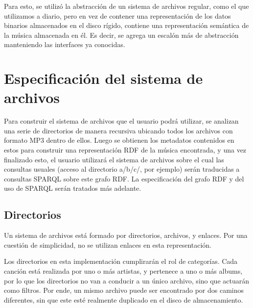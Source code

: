 \documentclass[a4paper,oneside]{report}
\begin{document}
Para esto, se utilizó la abstracción de un sistema de archivos regular, como el que utilizamos a diario, pero en vez de contener una representación de los datos binarios almacenados en el disco rígido, contiene una representación semántica de la música almacenada en él. Es decir, se agrega un escalón más de abstracción manteniendo las interfaces ya conocidas.


\chapter{Especificación del sistema de archivos}

Para construir el sistema de archivos que el usuario podrá utilizar, se analizan una serie de directorios de manera recursiva ubicando todos los archivos con formato MP3 dentro de ellos. Luego se obtienen los metadatos contenidos en estos para construir una representación RDF de la música encontrada, y una vez finalizado esto, el usuario utilizará el sistema de archivos sobre el cual las consultas usuales (acceso al directorio a/b/c/, por ejemplo) serán traducidas a consultas SPARQL sobre este grafo RDF. La especificación del grafo RDF y del uso de SPARQL serán tratados más adelante.

\section{Directorios}

Un sistema de archivos está formado por directorios, archivos, y enlaces. Por una cuestión de simplicidad, no se utilizan enlaces en esta representación.

Los directorios en esta implementación cumplirarán el rol de categorías. Cada canción está realizada por uno o más artistas, y pertenece a uno o más albums, por lo que los directorios no van a conducir a un único archivo, sino que actuarán como filtros. Por ende, un mismo archivo puede ser encontrado por dos caminos diferentes, sin que este esté realmente duplicado en el disco de almacenamiento.
\end{document}
